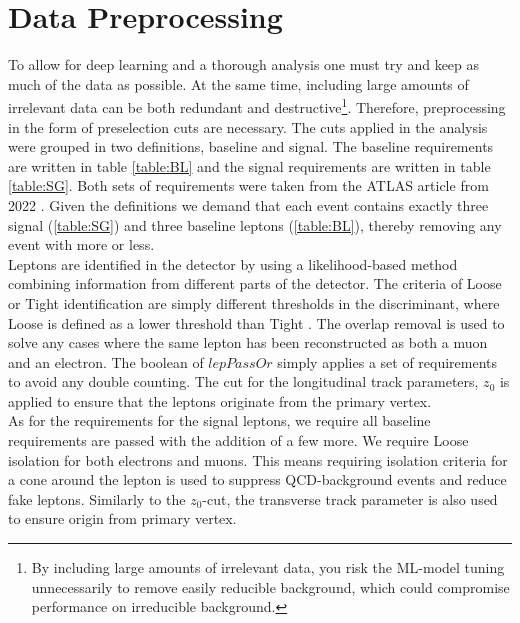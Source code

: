 \section{Data Preprocessing}\label{subsec:Cuts}
To allow for deep learning and a thorough analysis one must try and keep
as much of the data as possible. At the same time, including large amounts
of irrelevant data can be both redundant and destructive\footnote{By including 
large amounts of irrelevant data, you risk the \ac{ML}-model tuning unnecessarily 
to remove easily reducible background, which could compromise performance on irreducible 
background.}. Therefore, preprocessing in the form of preselection cuts are necessary. 
The cuts applied in the analysis were grouped in two definitions, baseline and signal. 
The baseline requirements are written in table \ref{table:BL} and the signal requirements are written 
in table \ref{table:SG}. Both sets of requirements were taken from the ATLAS article from 2022 \cite{franchini_search_2019}.
Given the definitions we demand that each event contains exactly three signal (\ref{table:SG}) and 
three baseline leptons (\ref{table:BL}), thereby removing any event with more or less. 
\\
Leptons are identified in the detector by using a likelihood-based method combining
information from different parts of the detector. The criteria of Loose or Tight 
identification are simply different thresholds in the discriminant, where Loose is 
defined as a lower threshold than Tight \cite{Aaboud_2019}. The overlap removal is used to solve any cases
where the same lepton has been reconstructed as both a muon and an electron. The boolean
of $lepPassOr$ simply applies a set of requirements to avoid any double counting. The cut for
the longitudinal track parameters, $z_0$ is applied to ensure that the leptons originate from the 
primary vertex.
\\
As for the requirements for the signal leptons, we require all baseline requirements are passed 
with the addition of a few more. We require Loose isolation for both electrons and muons. This means
requiring isolation criteria for a cone around the lepton is used to suppress \ac{QCD}-background events
and reduce fake leptons. Similarly to the $z_0$-cut, the transverse track parameter is also used to ensure 
origin from primary vertex.
